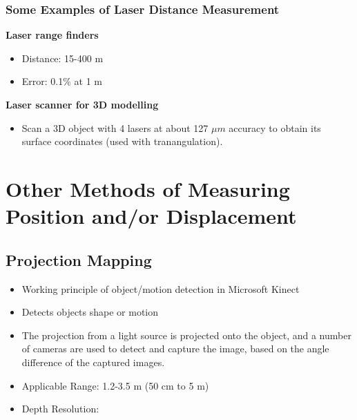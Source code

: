 \documentclass[class=report, crop=false, 12pt,a4paper]{standalone}
\begin{document}
\subsubsection{Some Examples of Laser Distance Measurement}
\textbf{Laser range finders}
\begin{itemize}
  \item Distance: 15-400 m
  \item Error: 0.1\% at 1 m
\end{itemize}
\textbf{Laser scanner for 3D modelling}
\begin{itemize}
  \item Scan a 3D object with 4 lasers at about 127 $\mu m$ accuracy to obtain its surface coordinates (used with tranangulation).
\end{itemize}
\section{Other Methods of Measuring Position and/or Displacement}
\subsection{Projection Mapping}
\begin{itemize}
  \item Working principle of object/motion detection in Microsoft Kinect
  \item Detects objects shape or motion
  \item The projection from a light source is projected onto the object, and a number of cameras are used to detect and capture the image, based on the angle difference of the captured images.
  \item Applicable Range: 1.2-3.5 m (50 cm to 5 m)
  \item Depth Resolution: 
\end{itemize}
\end{document}
